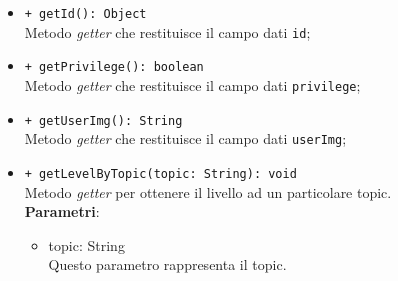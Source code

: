 \begin{itemize}
\begin{itemize}
				\item \texttt{+ getId(): Object} \\
				Metodo \textit{getter} che restituisce il campo dati \texttt{id};
				
				\item \texttt{+ getPrivilege(): boolean} \\
				Metodo \textit{getter} che restituisce il campo dati \texttt{privilege};
				
				\item \texttt{+ getUserImg(): String} \\
				Metodo \textit{getter} che restituisce il campo dati \texttt{userImg};
				
				\item \texttt{+ getLevelByTopic(topic: String): void} \\
				Metodo \textit{getter} per ottenere il livello ad un particolare topic.\\
				\textbf{Parametri}:
				\begin{itemize}
					\item {topic: String}\\
					Questo parametro rappresenta il topic.
				\end{itemize}
				
				
			\end{itemize}
		\end{itemize}	
		
		